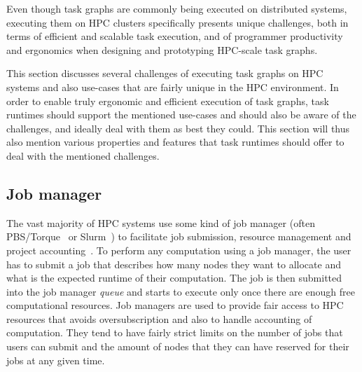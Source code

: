 Even though task graphs are commonly being executed on distributed systems,
executing them on HPC clusters specifically presents unique challenges, both in terms of
efficient and scalable task execution, and of programmer productivity and ergonomics when
designing and prototyping HPC-scale task graphs.



This section discusses several challenges of executing task graphs on HPC systems and also
use-cases that are fairly unique in the HPC environment. In order to enable truly ergonomic and
efficient execution of task graphs, task runtimes should support the mentioned use-cases and should
also be aware of the challenges, and ideally deal with them as best they could. This section will
thus also mention various properties and features that task runtimes should offer to deal with the
mentioned challenges.

\subsection{Job manager}
The vast majority of HPC systems use some kind of job manager (often PBS/Torque~\cite{pbs} or
Slurm~\cite{slurm}) to facilitate job submission, resource management and project
accounting~\cite{slurm-schedmd}. To perform any computation using a job manager, the user has to
submit a job that describes how many nodes they want to allocate and what is the expected
runtime of their computation. The job is then submitted into the job manager \emph{queue} and
starts to execute only once there are enough free computational resources. Job managers are used to
provide fair access to HPC resources that avoids oversubscription and also to handle accounting
of computation. They tend to have fairly strict limits on the number of jobs that users can submit
and the amount of nodes that they can have reserved for their jobs at any given time.

